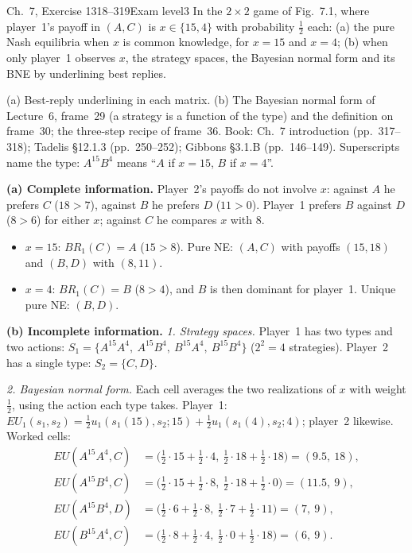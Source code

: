 \begin{exsol}{\MG{} Ch.~7, Exercise 1}{318--319}{Exam level}{3}
\asked In the $2\times 2$ game of Fig.~7.1, where player~1's payoff in $(A,C)$ is $x \in \{15, 4\}$
with probability $\frac12$ each: (a) the pure Nash equilibria when $x$ is common knowledge, for
$x = 15$ and $x = 4$; (b) when only player~1 observes $x$, the strategy spaces, the Bayesian normal
form and its BNE by underlining best replies.

\method (a) Best-reply underlining in each matrix. (b) The Bayesian normal form of Lecture~6,
frame~29 (a strategy is a function of the type) and the definition on frame~30; the three-step
recipe of frame~36. Book: \MG{} Ch.~7 introduction (pp.~317--318); Tadelis \S12.1.3 (pp.~250--252);
Gibbons \S3.1.B (pp.~146--149). Superscripts name the type: $A^{15}B^{4}$ means ``$A$ if $x = 15$,
$B$ if $x = 4$''.

\solution
\textbf{(a) Complete information.} Player~2's payoffs do not involve $x$: against $A$ he prefers $C$
($18 > 7$), against $B$ he prefers $D$ ($11 > 0$). Player~1 prefers $B$ against $D$ ($8 > 6$) for
either $x$; against $C$ he compares $x$ with $8$.
\begin{itemize}
  \item $x = 15$: $BR_1(C) = A$ ($15 > 8$). Pure NE: $(A, C)$ with payoffs $(15,18)$ and $(B,D)$ with
  $(8,11)$.
  \item $x = 4$: $BR_1(C) = B$ ($8 > 4$), and $B$ is then dominant for player~1. Unique pure NE:
  $(B, D)$.
\end{itemize}

\textbf{(b) Incomplete information.}
\emph{1. Strategy spaces.} Player~1 has two types and two actions:
$S_1 = \{A^{15}A^{4},\ A^{15}B^{4},\ B^{15}A^{4},\ B^{15}B^{4}\}$ ($2^2 = 4$ strategies). Player~2 has a
single type: $S_2 = \{C, D\}$.

\emph{2. Bayesian normal form.} Each cell averages the two realizations of $x$ with weight $\frac12$,
using the action each type takes. Player~1: $EU_1(s_1, s_2) = \frac12 u_1(s_1(15), s_2; 15) +
\frac12 u_1(s_1(4), s_2; 4)$; player~2 likewise. Worked cells:
\begin{align*}
  EU(A^{15}A^{4}, C) &= \bigl(\tfrac12\cdot 15 + \tfrac12\cdot 4,\ \tfrac12\cdot 18 + \tfrac12\cdot 18\bigr)
  = (9.5,\ 18),\\
  EU(A^{15}B^{4}, C) &= \bigl(\tfrac12\cdot 15 + \tfrac12\cdot 8,\ \tfrac12\cdot 18 + \tfrac12\cdot 0\bigr)
  = (11.5,\ 9),\\
  EU(A^{15}B^{4}, D) &= \bigl(\tfrac12\cdot 6 + \tfrac12\cdot 8,\ \tfrac12\cdot 7 + \tfrac12\cdot 11\bigr)
  = (7,\ 9),\\
  EU(B^{15}A^{4}, C) &= \bigl(\tfrac12\cdot 8 + \tfrac12\cdot 4,\ \tfrac12\cdot 0 + \tfrac12\cdot 18\bigr)
  = (6,\ 9).
\end{align*}


\end{exsol}
